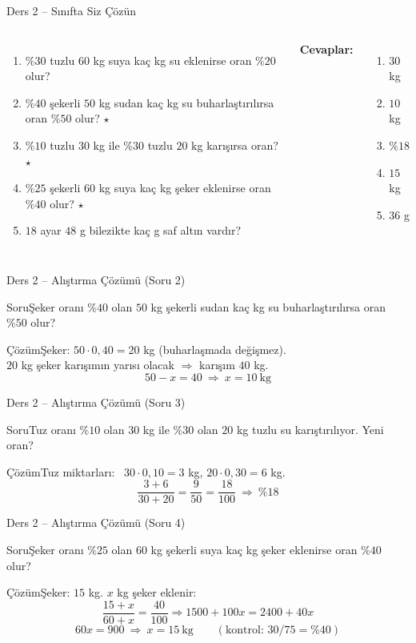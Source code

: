 \documentclass[aspectratio=169,11pt,handout]{beamer}
\newcommand{\soru}[3]{%
\begin{frame}{#1}
  \begin{block}{Soru}\large #2\end{block}
  \pause
  \begin{exampleblock}{Çözüm}\large #3\end{exampleblock}
\end{frame}}
\begin{document}
\begin{frame}{Ders 2 -- Sınıfta Siz Çözün}
\begin{columns}[t]
\begin{enumerate}
\item \(\%30\) tuzlu \(60\) kg suya kaç kg su eklenirse oran \(\%20\) olur?
\item \(\%40\) şekerli \(50\) kg sudan kaç kg su buharlaştırılırsa oran \(\%50\) olur? \(\star\)
\item \(\%10\) tuzlu \(30\) kg ile \(\%30\) tuzlu \(20\) kg karışırsa oran? \(\star\)
\item \(\%25\) şekerli \(60\) kg suya kaç kg şeker eklenirse oran \(\%40\) olur? \(\star\)
\item \(18\) ayar \(48\) g bilezikte kaç g saf altın vardır?
\end{enumerate}
\pause
\textbf{Cevaplar:}
\begin{enumerate}
\item \(30\) kg
\item \(10\) kg
\item \(\%18\)
\item \(15\) kg
\item \(36\) g
\end{enumerate}
\end{columns}
\vspace{4pt}{\footnotesize \(\star\) işaretli soruların adım adım çözümü sonraki slaytlardadır.}
\end{frame}

\soru{Ders 2 -- Alıştırma Çözümü (Soru 2)}
{Şeker oranı \(\%40\) olan \(50\) kg şekerli sudan kaç kg su buharlaştırılırsa oran \(\%50\) olur?}
{Şeker: \(50\cdot 0{,}40=20\) kg (buharlaşmada değişmez).\\[3pt]
\(20\) kg şeker karışımın yarısı olacak \(\Rightarrow\) karışım \(40\) kg.
\[50-x=40\ \Rightarrow\ x=10\ \text{kg}\]}

\soru{Ders 2 -- Alıştırma Çözümü (Soru 3)}
{Tuz oranı \(\%10\) olan \(30\) kg ile \(\%30\) olan \(20\) kg tuzlu su karıştırılıyor. Yeni oran?}
{Tuz miktarları: \ \(30\cdot 0{,}10=3\) kg, \quad \(20\cdot 0{,}30=6\) kg.
\[\frac{3+6}{30+20}=\frac{9}{50}=\frac{18}{100}\ \Rightarrow\ \%18\]}

\soru{Ders 2 -- Alıştırma Çözümü (Soru 4)}
{Şeker oranı \(\%25\) olan \(60\) kg şekerli suya kaç kg şeker eklenirse oran \(\%40\) olur?}
{Şeker: \(15\) kg. \(x\) kg şeker eklenir:
\[\frac{15+x}{60+x}=\frac{40}{100}\Rightarrow 1500+100x=2400+40x\]
\[60x=900\ \Rightarrow\ x=15\ \text{kg}\qquad(\text{kontrol: } 30/75=\%40)\]}
\end{document}
